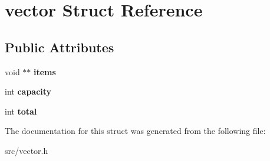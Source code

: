 \hypertarget{structvector}{}\section{vector Struct Reference}
\label{structvector}
\subsection*{Public Attributes}
\begin{DoxyCompactItemize}
\item 
\mbox{\label{structvector_afc579e8c5db400ff5e6889ccbf9bae84}} 
void $\ast$$\ast$ {\bfseries items}
\item 
\mbox{\label{structvector_a95bc684a8044cfc0e509861448908bf2}} 
int {\bfseries capacity}
\item 
\mbox{\label{structvector_a4f0027e471002baba95e3981d78ea3a7}} 
int {\bfseries total}
\end{DoxyCompactItemize}


The documentation for this struct was generated from the following file\+:\begin{DoxyCompactItemize}
\item 
src/vector.\+h\end{DoxyCompactItemize}
